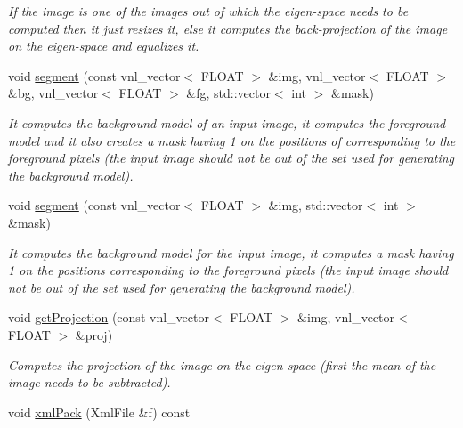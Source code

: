 \begin{DoxyCompactItemize}
\begin{DoxyCompactList}\small\item\em If the image is one of the images out of which the eigen-\/space needs to be computed then it just resizes it, else it computes the back-\/projection of the image on the eigen-\/space and equalizes it. \item\end{DoxyCompactList}\item 
\hypertarget{classBackground_aacb21ac01bd83b6e74b2550d6fa10c3a}{
void \hyperlink{classBackground_aacb21ac01bd83b6e74b2550d6fa10c3a}{segment} (const vnl\_\-vector$<$ FLOAT $>$ \&img, vnl\_\-vector$<$ FLOAT $>$ \&bg, vnl\_\-vector$<$ FLOAT $>$ \&fg, std::vector$<$ int $>$ \&mask)}
\label{classBackground_aacb21ac01bd83b6e74b2550d6fa10c3a}

\begin{DoxyCompactList}\small\item\em It computes the background model of an input image, it computes the foreground model and it also creates a mask having 1 on the positions of corresponding to the foreground pixels (the input image should not be out of the set used for generating the background model). \item\end{DoxyCompactList}\item 
\hypertarget{classBackground_aaeb525adb786cb325c28fb964bb725bc}{
void \hyperlink{classBackground_aaeb525adb786cb325c28fb964bb725bc}{segment} (const vnl\_\-vector$<$ FLOAT $>$ \&img, std::vector$<$ int $>$ \&mask)}
\label{classBackground_aaeb525adb786cb325c28fb964bb725bc}

\begin{DoxyCompactList}\small\item\em It computes the background model for the input image, it computes a mask having 1 on the positions corresponding to the foreground pixels (the input image should not be out of the set used for generating the background model). \item\end{DoxyCompactList}\item 
\hypertarget{classBackground_a58564ca6e89666e4508d4a12284ccc69}{
void \hyperlink{classBackground_a58564ca6e89666e4508d4a12284ccc69}{getProjection} (const vnl\_\-vector$<$ FLOAT $>$ \&img, vnl\_\-vector$<$ FLOAT $>$ \&proj)}
\label{classBackground_a58564ca6e89666e4508d4a12284ccc69}

\begin{DoxyCompactList}\small\item\em Computes the projection of the image on the eigen-\/space (first the mean of the image needs to be subtracted). \item\end{DoxyCompactList}\item 
\hypertarget{classBackground_ac5f640e4b28f43593586ce4b08f94585}{
void \hyperlink{classBackground_ac5f640e4b28f43593586ce4b08f94585}{xmlPack} (XmlFile \&f) const }
\label{classBackground_ac5f640e4b28f43593586ce4b08f94585}


\end{DoxyCompactItemize}
